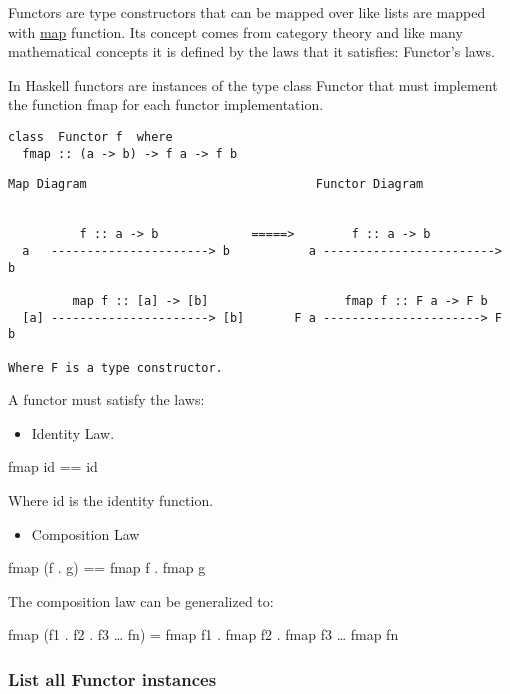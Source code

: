 \documentclass[11pt]{article}
\begin{document}
Functors are type constructors that can be mapped over like lists are
mapped with \uline{map} function. Its concept comes from category theory and like many mathematical concepts
it is defined by the laws that it satisfies: Functor's laws. 

In Haskell functors are instances of the type class Functor that must
implement the function fmap for each functor implementation.

\begin{verbatim}
class  Functor f  where
  fmap :: (a -> b) -> f a -> f b
\end{verbatim}


\begin{verbatim}
Map Diagram                                Functor Diagram 


          f :: a -> b             =====>        f :: a -> b
  a   ----------------------> b           a ------------------------> b
             
         map f :: [a] -> [b]                   fmap f :: F a -> F b 
  [a] ----------------------> [b]       F a ----------------------> F b

Where F is a type constructor.
\end{verbatim}
A functor must satisfy the laws:

\begin{itemize}
\item Identity Law.
\end{itemize}

fmap id == id   

Where id is the identity function. 

\begin{itemize}
\item Composition Law
\end{itemize}

fmap (f . g) == fmap f . fmap g

The composition law can be generalized to:

fmap (f1 . f2 . f3 \ldots{} fn) = fmap f1 . fmap f2 . fmap f3 \ldots{} fmap fn 

\subsubsection{List all Functor instances}
\label{sec-1-12-2}
\end{document}
